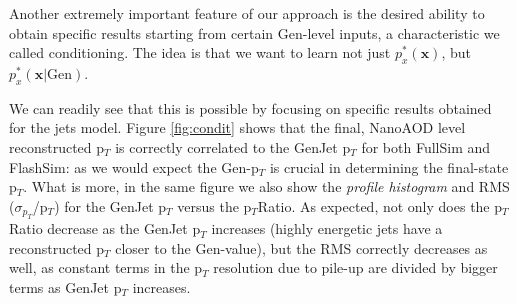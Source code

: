 Another extremely important feature of our approach is the desired ability to obtain specific results starting from certain Gen-level inputs, a characteristic we called conditioning. The idea is that we want to learn not just $p^*_x(\mathbf{x})$, but $p^*_x(\mathbf{x}|\text{Gen})$.

We can readily see that this is possible by focusing on specific results obtained for the jets model. Figure \ref{fig:condit} shows that the final, NanoAOD level reconstructed p$_T$ is correctly correlated to the GenJet p$_T$ for both FullSim and FlashSim: as we would expect the Gen-p$_T$ is crucial in determining the final-state p$_T$. What is more, in the same figure we also show the \emph{profile histogram} and RMS ($\sigma_{p_T}$/p$_T$) for the GenJet p$_T$ versus the p$_T$Ratio. As expected, not only does the p$_T$Ratio decrease as the GenJet p$_T$ increases (highly energetic jets have a reconstructed p$_T$ closer to the Gen-value), but the RMS correctly decreases as well, as constant terms in the p$_T$ resolution due to pile-up are divided by bigger terms as GenJet p$_T$ increases.

